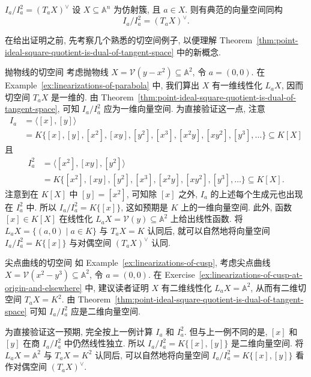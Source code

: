 \begin{Theorem}{$I_{a}/I_{a}^{2}=(T_{a}X)^{\vee}$}\leavevmode\label{thm:point-ideal-square-quotient-is-dual-of-tangent-space}
设 $X\subseteq\mathbb{A}^{n}$ 为仿射簇, 且 $a\in X$. 则有典范的向量空间同构
\[
  I_{a}/I_{a}^{2}=(T_{a}X)^{\vee}.
\]
\end{Theorem}

在给出证明之前, 先考察几个熟悉的切空间例子, 以便理解 Theorem~\ref{thm:point-ideal-square-quotient-is-dual-of-tangent-space} 中的新概念.

\begin{Example}{抛物线的切空间}\leavevmode\label{ex:tangent-space-of-parabola}
考虑抛物线 $X=\mathcal{V}(y-x^{2})\subseteq\mathbb{A}^{2}$, 令 $a=(0,0)$. 在 Example~\ref{ex:linearizations-of-parabola} 中, 我们算出 $X$ 有一维线性化 $L_{a}X$, 因而切空间 $T_{a}X$ 是一维的. 由 Theorem~\ref{thm:point-ideal-square-quotient-is-dual-of-tangent-space}, 可知 $I_{a}/I_{a}^{2}$ 应为一维向量空间. 为直接验证这一点, 注意
\[
  \begin{aligned}
    I_{a}&=\langle[x],[y]\rangle\\
      &=K\{[x],[y],[x^{2}],[xy],[y^{2}],[x^{3}],[x^{2}y],[xy^{2}],[y^{3}],\ldots\}\subseteq K[X]
  \end{aligned}
\]
且
\[
  \begin{aligned}
    I_{a}^{2}&=\langle[x^{2}],[xy],[y^{2}]\rangle\\
      &=K\{[x^{2}],[xy],[y^{2}],[x^{3}],[x^{2}y],[xy^{2}],[y^{3}],\ldots\}\subseteq K[X].
  \end{aligned}
\]
注意到在 $K[X]$ 中 $[y]=[x^{2}]$, 可知除 $[x]$ 之外, $I_{a}$ 的上述每个生成元也出现在 $I_{a}^{2}$ 中. 所以 $I_{a}/I_{a}^{2}=K\{[x]\}$, 这如预期是 $K$ 上的一维向量空间. 此外, 函数 $[x]\in K[X]$ 在线性化 $L_{a}X=\mathcal{V}(y)\subseteq\mathbb{A}^{2}$ 上给出线性函数. 将 $L_{a}X=\{(a,0)\mid a\in K\}$ 与 $T_{a}X=K$ 认同后, 就可以自然地将向量空间 $I_{a}/I_{a}^{2}=K\{[x]\}$ 与对偶空间 $(T_{a}X)^{\vee}$ 认同.
\end{Example}

\begin{Example}{尖点曲线的切空间}\leavevmode\label{ex:tangent-space-of-cusp}
如 Example~\ref{ex:linearizations-of-cusp}, 考虑尖点曲线 $X=\mathcal{V}(x^{2}-y^{3})\subseteq\mathbb{A}^{2}$, 令 $a=(0,0)$. 在 Exercise~\ref{ex:linearizations-of-cusp-at-origin-and-elsewhere} 中, 建议读者证明 $X$ 有二维线性化 $L_{a}X=\mathbb{A}^{2}$, 从而有二维切空间 $T_{a}X=K^{2}$. 由 Theorem~\ref{thm:point-ideal-square-quotient-is-dual-of-tangent-space} 可知 $I_{a}/I_{a}^{2}$ 应是二维向量空间.

为直接验证这一预期, 完全按上一例计算 $I_{a}$ 和 $I_{a}^{2}$. 但与上一例不同的是, $[x]$ 和 $[y]$ 在商 $I_{a}/I_{a}^{2}$ 中仍然线性独立. 所以 $I_{a}/I_{a}^{2}=K\{[x],[y]\}$ 是二维向量空间. 将 $L_{a}X=\mathbb{A}^{2}$ 与 $T_{a}X=K^{2}$ 认同后, 可以自然地将向量空间 $I_{a}/I_{a}^{2}=K\{[x],[y]\}$ 看作对偶空间 $(T_{a}X)^{\vee}$.
\end{Example}

